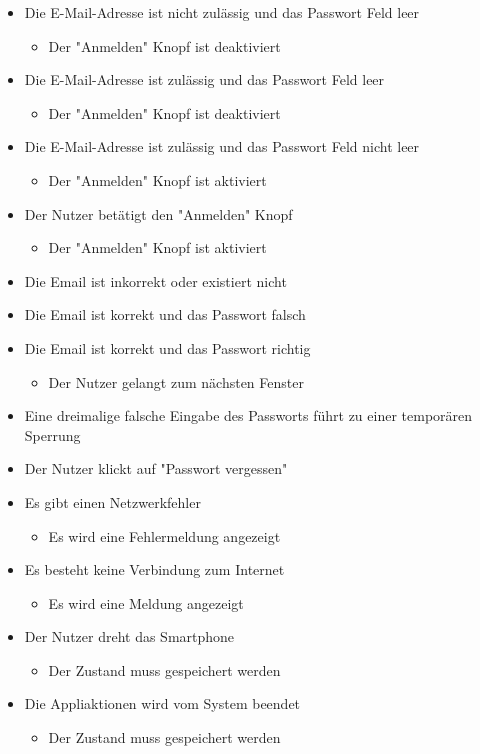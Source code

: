 \begin{itemize}
    \item Die E-Mail-Adresse ist nicht zulässig und das Passwort Feld leer
    \begin{itemize}
        \item Der "Anmelden" Knopf ist deaktiviert
     \end{itemize}
    \item Die E-Mail-Adresse ist zulässig und das Passwort Feld leer
    \begin{itemize}
        \item Der "Anmelden" Knopf ist deaktiviert
    \end{itemize}
    \item Die E-Mail-Adresse ist zulässig und das Passwort Feld nicht leer
    \begin{itemize}
        \item Der "Anmelden" Knopf ist aktiviert
    \end{itemize}
    \item Der Nutzer betätigt den "Anmelden" Knopf
    \begin{itemize}
        \item Der "Anmelden" Knopf ist aktiviert
    \end{itemize}
    \item Die Email ist inkorrekt oder existiert nicht
    \item Die Email ist korrekt und das Passwort falsch
    \item Die Email ist korrekt und das Passwort richtig
    \begin{itemize}
        \item Der Nutzer gelangt zum nächsten Fenster
    \end{itemize}
    \item Eine dreimalige falsche Eingabe des Passworts führt zu einer temporären Sperrung
    \item Der Nutzer klickt auf "Passwort vergessen"
    \item Es gibt einen Netzwerkfehler
    \begin{itemize}
        \item Es wird eine Fehlermeldung angezeigt
    \end{itemize}
    \item Es besteht keine Verbindung zum Internet
    \begin{itemize}
        \item Es wird eine Meldung angezeigt
    \end{itemize}
    \item Der Nutzer dreht das Smartphone
    \begin{itemize}
        \item Der Zustand muss gespeichert werden
    \end{itemize}
    \item Die Appliaktionen wird vom System beendet
    \begin{itemize}
        \item Der Zustand muss gespeichert werden
    \end{itemize}
\end{itemize}

